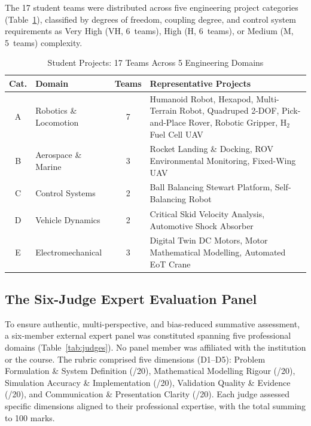 \documentclass[utf8]{FrontiersinHarvard}
\begin{document}
The 17 student teams were distributed across five engineering project
categories (Table~\ref{tab:projects}), classified by degrees of freedom,
coupling degree, and control system requirements as Very High (VH, 6~teams),
High (H, 6~teams), or Medium (M, 5~teams) complexity.

\begin{table}[h]
\caption{Student Projects: 17 Teams Across 5 Engineering Domains}
\label{tab:projects}
\begin{tabular}{clcp{7cm}}
\toprule
\textbf{Cat.} & \textbf{Domain} & \textbf{Teams} & \textbf{Representative Projects} \\
\midrule
A & Robotics \& Locomotion  & 7 & Humanoid Robot, Hexapod, Multi-Terrain Robot, Quadruped 2-DOF, Pick-and-Place Rover, Robotic Gripper, H$_2$ Fuel Cell UAV \\
B & Aerospace \& Marine     & 3 & Rocket Landing \& Docking, ROV Environmental Monitoring, Fixed-Wing UAV \\
C & Control Systems         & 2 & Ball Balancing Stewart Platform, Self-Balancing Robot \\
D & Vehicle Dynamics        & 2 & Critical Skid Velocity Analysis, Automotive Shock Absorber \\
E & Electromechanical       & 3 & Digital Twin DC Motors, Motor Mathematical Modelling, Automated EoT Crane \\
\bottomrule
\end{tabular}
\end{table}

\subsection{The Six-Judge Expert Evaluation Panel}

To ensure authentic, multi-perspective, and bias-reduced summative
assessment, a six-member external expert panel was constituted spanning
five professional domains (Table~\ref{tab:judges}). No panel member was
affiliated with the institution or the course. The rubric comprised five
dimensions (D1--D5): Problem Formulation \& System Definition (/20),
Mathematical Modelling Rigour (/20), Simulation Accuracy \& Implementation
(/20), Validation Quality \& Evidence (/20), and Communication \&
Presentation Clarity (/20). Each judge assessed specific dimensions aligned
to their professional expertise, with the total summing to 100 marks.
\end{document}
